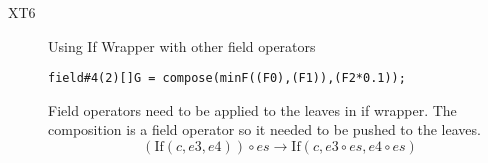 \begin{description}
\item[XT6]
Using If Wrapper with other field operators
\begin{lstlisting}[mathescape=true]
field#4(2)[]G = compose(minF((F0),(F1)),(F2*0.1));
\end{lstlisting}
Field operators need to be applied to the leaves in if wrapper. 
The composition is a field operator so it needed to be pushed to the leaves.
$$(\text{If}(c, e3,e4)) \circ es  
\rightarrow
\text{If}(c, e3  \circ es ,e4 \circ es) $$
\end{description}
